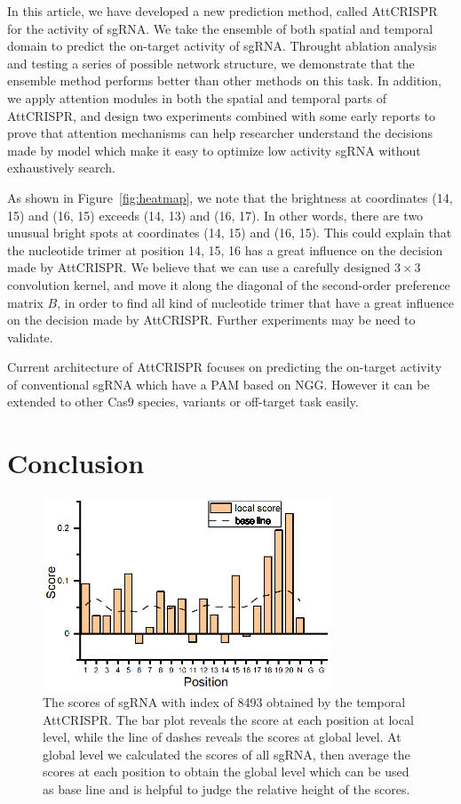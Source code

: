 \documentclass{bioinfo}
\begin{document}
In this article, we have developed a new prediction method, called AttCRISPR for the activity of sgRNA. 
We take the ensemble of both spatial and temporal domain to predict the on-target activity of sgRNA. 
Throught ablation analysis and testing a series of possible network structure, we demonstrate that the ensemble method performs better than other methods on this task. 
In addition, we apply attention modules in both the spatial and temporal parts of AttCRISPR, 
and design two experiments combined with some early reports to prove that attention mechanisms can help researcher understand the decisions made by model which make it easy to optimize low activity sgRNA without exhaustively search. 

As shown in Figure~\ref{fig:heatmap}, we note that the brightness at coordinates (14, 15) and (16, 15) exceeds (14, 13) and (16, 17). 
In other words, there are two unusual bright spots at coordinates (14, 15) and (16, 15). 
This could explain that the nucleotide trimer at position 14, 15, 16 has a great influence on the decision made by AttCRISPR. 
We believe that we can use a carefully designed $3\times 3$ convolution kernel, and move it along the diagonal of the second-order preference matrix $B$, 
in order to find all kind of nucleotide trimer that have a great influence on the decision made by AttCRISPR. 
Further experiments may be need to validate. 

Current architecture of AttCRISPR focuses on predicting the on-target activity of conventional sgRNA which have a PAM based on NGG. 
However it can be extended to other Cas9 species, variants or off-target task easily. 

\section{Conclusion}

\begin{figure}[!tpb]
    \centerline{\includegraphics[width=86mm]{local0.eps}}
    \caption{
The scores of sgRNA with index of 8493 obtained by the temporal AttCRISPR. 
The bar plot reveals the score at each position at local level, while the line of dashes reveals the scores at global level. 
At global level we calculated the scores of all sgRNA, then average the scores at each position to obtain the global level which can be used as base line and is helpful to judge the relative height of the scores. 
}\label{fig:opt}
\end{figure}
\end{document}
